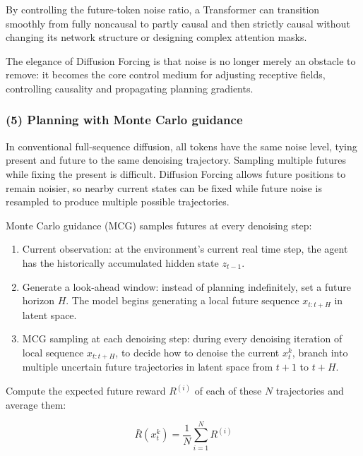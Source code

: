 By controlling the future-token noise ratio, a Transformer can transition smoothly from fully noncausal to partly causal and then strictly causal without changing its network structure or designing complex attention masks.

The elegance of Diffusion Forcing is that noise is no longer merely an obstacle to remove: it becomes the core control medium for adjusting receptive fields, controlling causality and propagating planning gradients.

\hypertarget{planning-with-monte-carlo-guidance}{%
\subsubsection{(5) Planning with Monte Carlo guidance}\label{planning-with-monte-carlo-guidance}}

In conventional full-sequence diffusion, all tokens have the same noise level, tying present and future to the same denoising trajectory. Sampling multiple futures while fixing the present is difficult. Diffusion Forcing allows future positions to remain noisier, so nearby current states can be fixed while future noise is resampled to produce multiple possible trajectories.

Monte Carlo guidance (MCG) samples futures at every denoising step:

\begin{enumerate}
\def\labelenumi{\arabic{enumi}.}
\tightlist
\item
  Current observation: at the environment's current real time step, the agent has the historically accumulated hidden state \(z_{t-1}\).
\item
  Generate a look-ahead window: instead of planning indefinitely, set a future horizon \(H\). The model begins generating a local future sequence \(x_{t:t+H}\) in latent space.
\item
  MCG sampling at each denoising step: during every denoising iteration of local sequence \(x_{t:t+H}\), to decide how to denoise the current \(x_t^k\), branch into multiple uncertain future trajectories in latent space from \(t+1\) to \(t+H\).
\end{enumerate}

Compute the expected future reward \(R^{(i)}\) of each of these \(N\) trajectories and average them:

\[
\bar{R}(x_t^k)=\frac{1}{N}\sum_{i=1}^N R^{(i)}
\]

